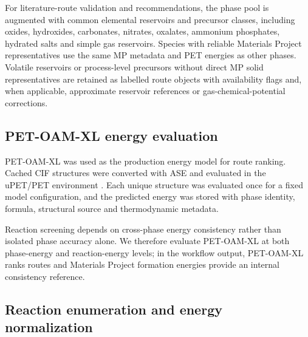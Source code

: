 \documentclass[11pt, letterpaper]{article}
\begin{document}
For literature-route validation and recommendations, the phase pool is augmented with common elemental reservoirs and precursor classes, including oxides, hydroxides, carbonates, nitrates, oxalates, ammonium phosphates, hydrated salts and simple gas reservoirs. Species with reliable Materials Project representatives use the same MP metadata and PET energies as other phases. Volatile reservoirs or process-level precursors without direct MP solid representatives are retained as labelled route objects with availability flags and, when applicable, approximate reservoir references or gas-chemical-potential corrections.

\subsection*{PET-OAM-XL energy evaluation}

PET-OAM-XL was used as the production energy model for route ranking. Cached CIF structures were converted with ASE and evaluated in the uPET/PET environment \cite{hjorthlarsen2017ase,pozdnyakov2023pet,mazitov2025petmad,bigi2026upet}. Each unique structure was evaluated once for a fixed model configuration, and the predicted energy was stored with phase identity, formula, structural source and thermodynamic metadata.

Reaction screening depends on cross-phase energy consistency rather than isolated phase accuracy alone. We therefore evaluate PET-OAM-XL at both phase-energy and reaction-energy levels; in the workflow output, PET-OAM-XL ranks routes and Materials Project formation energies provide an internal consistency reference.

\subsection*{Reaction enumeration and energy normalization}
\end{document}
